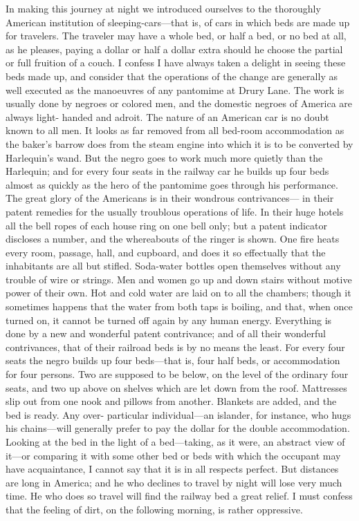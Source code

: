 In making this journey at night we introduced ourselves to the
thoroughly American institution of sleeping-cars---that is, of cars
in which beds are made up for travelers.  The traveler may have a
whole bed, or half a bed, or no bed at all, as he pleases, paying a
dollar or half a dollar extra should he choose the partial or full
fruition of a couch.  I confess I have always taken a delight in
seeing these beds made up, and consider that the operations of the
change are generally as well executed as the manoeuvres of any
pantomime at Drury Lane.  The work is usually done by negroes or
colored men, and the domestic negroes of America are always light-
handed and adroit.  The nature of an American car is no doubt known
to all men.  It looks as far removed from all bed-room
accommodation as the baker's barrow does from the steam engine into
which it is to be converted by Harlequin's wand.  But the negro
goes to work much more quietly than the Harlequin; and for every
four seats in the railway car he builds up four beds almost as
quickly as the hero of the pantomime goes through his performance.
The great glory of the Americans is in their wondrous contrivances---%
in their patent remedies for the usually troublous operations of
life.  In their huge hotels all the bell ropes of each house ring
on one bell only; but a patent indicator discloses a number, and
the whereabouts of the ringer is shown.  One fire heats every room,
passage, hall, and cupboard, and does it so effectually that the
inhabitants are all but stifled.  Soda-water bottles open
themselves without any trouble of wire or strings.  Men and women
go up and down stairs without motive power of their own.  Hot and
cold water are laid on to all the chambers; though it sometimes
happens that the water from both taps is boiling, and that, when
once turned on, it cannot be turned off again by any human energy.
Everything is done by a new and wonderful patent contrivance; and
of all their wonderful contrivances, that of their railroad beds is
by no means the least.  For every four seats the negro builds up
four beds---that is, four half beds, or accommodation for four
persons.  Two are supposed to be below, on the level of the
ordinary four seats, and two up above on shelves which are let down
from the roof.  Mattresses slip out from one nook and pillows from
another.  Blankets are added, and the bed is ready.  Any over-
particular individual---an islander, for instance, who hugs his
chains---will generally prefer to pay the dollar for the double
accommodation.  Looking at the bed in the light of a bed---taking,
as it were, an abstract view of it---or comparing it with some other
bed or beds with which the occupant may have acquaintance, I cannot
say that it is in all respects perfect.  But distances are long in
America; and he who declines to travel by night will lose very much
time.  He who does so travel will find the railway bed a great
relief.  I must confess that the feeling of dirt, on the following
morning, is rather oppressive.

